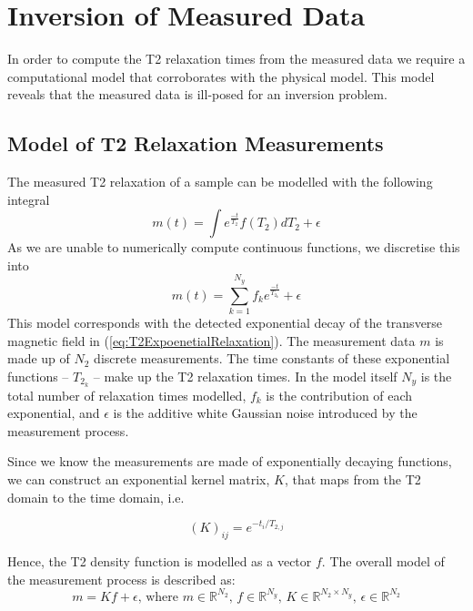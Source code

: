 \section{Inversion of Measured Data}
In order to compute the T2 relaxation times from the measured data we require a computational model that corroborates with the physical model. This model reveals that the measured data is ill-posed for an inversion problem.

\subsection{Model of T2 Relaxation Measurements} \label{subsec:modelT2relaxation}
The measured T2 relaxation of a sample can be modelled with the following integral
\begin{equation}
    m(t) = \int e^{\frac{-t}{T_2}} f(T_2) dT_2 + \epsilon
    \label{eq:T2RelaxationModelContinuous}
\end{equation}
As we are unable to numerically compute continuous functions, we discretise this into
\begin{equation}
    \hat{m}(t) = \sum^{N_y}_{k = 1} f_k e^{\frac{-t}{T_{2_k}}} + \epsilon
    \label{eq:T2RelaxationModel}
\end{equation}
This model corresponds with the detected exponential decay of the transverse magnetic field in (\ref{eq:T2ExpoenetialRelaxation}). The measurement data $m$ is made up of $N_2$ discrete measurements. The time constants of these exponential functions -- $T_{2_k}$ -- make up the T2 relaxation times. In the model itself $N_y$ is the total number of relaxation times modelled, $f_k$ is the contribution of each exponential, and $\epsilon$ is the additive white Gaussian noise introduced by the measurement process.

Since we know the measurements are made of exponentially decaying functions, we can construct an exponential kernel matrix, $K$, that maps from the T2 domain to the time domain, i.e.

\begin{equation}
    (K)_{ij} = e^{-t_i / T_{2,j}}
\end{equation}

Hence, the T2 density function is modelled as a vector $f$. The overall model of the measurement process is described as:
\begin{equation}
    m = Kf + \epsilon \text{, where } m \in \mathbb{R}^{N_2} \text{, } f \in \mathbb{R}^{N_y} \text{, } K \in \mathbb{R}^{N_2 \times N_y} \text{, } \epsilon \in \mathbb{R}^{N_2}
    \label{eq:T2RelaxationModelMatrices}
\end{equation}



